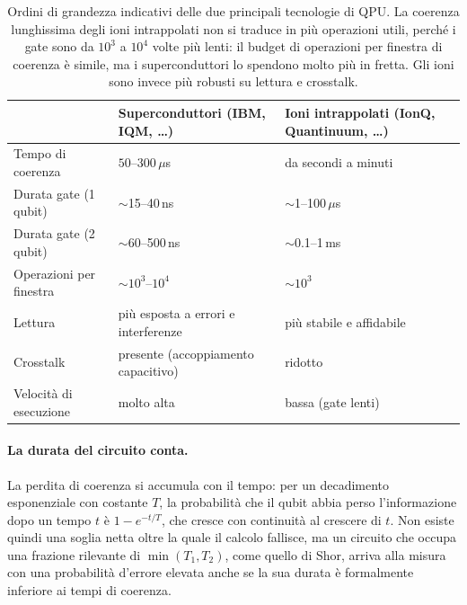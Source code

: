 \begin{table}[H]
\centering

\small
\begin{tabularx}{\textwidth}{@{}lXX@{}}
\toprule
 & \textbf{Superconduttori (IBM, IQM, \ldots)} & \textbf{Ioni intrappolati (IonQ, Quantinuum, \ldots)} \\
\midrule
Tempo di coerenza          & $50$--$300\,\mu$s                      & da secondi a minuti \\
\addlinespace[0.3em]
Durata gate (1 qubit)      & $\sim$15--40\,ns                       & $\sim$1--100\,$\mu$s \\
\addlinespace[0.3em]
Durata gate (2 qubit)      & $\sim$60--500\,ns                      & $\sim$0.1--1\,ms \\
\addlinespace[0.3em]
Operazioni per finestra    & $\sim 10^{3}$--$10^{4}$                & $\sim 10^{3}$ \\
\addlinespace[0.3em]
Lettura                    & più esposta a errori e interferenze     & più stabile e affidabile \\
\addlinespace[0.3em]
Crosstalk                  & presente (accoppiamento capacitivo)     & ridotto \\
\addlinespace[0.3em]
Velocità di esecuzione     & molto alta                              & bassa (gate lenti) \\
\bottomrule
\end{tabularx}
\caption[Confronto tra tecnologie di QPU: superconduttori vs ioni intrappolati]{Ordini di grandezza indicativi delle due principali tecnologie di \ac{QPU}. La coerenza lunghissima degli ioni intrappolati non si traduce in più operazioni utili, perché i gate sono da $10^3$ a $10^4$ volte più lenti: il budget di operazioni per finestra di coerenza è simile, ma i superconduttori lo spendono molto più in fretta. Gli ioni sono invece più robusti su lettura e crosstalk.}\label{tab:tecnologie_qpu}

\end{table}

\paragraph{La durata del circuito conta.}
La perdita di coerenza si accumula con il tempo: per un decadimento esponenziale con costante $T$, la probabilità che il qubit abbia perso l'informazione dopo un tempo $t$ è $1-e^{-t/T}$, che cresce con continuità al crescere di $t$. Non esiste quindi una soglia netta oltre la quale il calcolo fallisce, ma un circuito che occupa una frazione rilevante di $\min(T_1,T_2)$, come quello di Shor, arriva alla misura con una probabilità d'errore elevata anche se la sua durata è formalmente inferiore ai tempi di coerenza.

